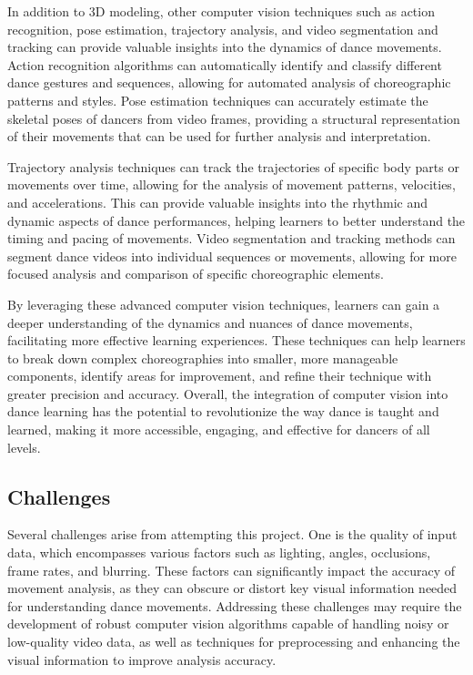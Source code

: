  In addition to 3D modeling, other computer vision techniques such as action recognition, pose 
estimation, trajectory analysis, and video segmentation and tracking can provide valuable insights 
into the dynamics of dance movements. Action recognition algorithms can automatically identify and 
classify different dance gestures and sequences, allowing for automated analysis of choreographic 
patterns and styles. Pose estimation techniques can accurately estimate the skeletal poses of 
dancers from video frames, providing a structural representation of their movements that can be 
used for further analysis and interpretation.

Trajectory analysis techniques can track the trajectories of specific body parts or movements 
over time, allowing for the analysis of movement patterns, velocities, and accelerations. \cite{Alpher02}This 
can provide valuable insights into the rhythmic and dynamic aspects of dance performances, 
helping learners to better understand the timing and pacing of movements. Video segmentation and 
tracking methods can segment dance videos into individual sequences or movements, allowing for more 
focused analysis and comparison of specific choreographic elements.

By leveraging these advanced computer vision techniques, learners can gain a deeper understanding 
of the dynamics and nuances of dance movements, facilitating more effective learning experiences. 
These techniques can help learners to break down complex choreographies into smaller, more 
manageable components, identify areas for improvement, and refine their technique with greater 
precision and accuracy. Overall, the integration of computer vision into dance learning has the 
potential to revolutionize the way dance is taught and learned, making it more accessible, engaging, 
and effective for dancers of all levels.

\subsection{Challenges}
Several challenges arise from attempting this project. One is the quality of input data, which 
encompasses various factors such as lighting, angles, occlusions, frame rates, and blurring. These 
factors can significantly impact the accuracy of movement analysis, as they can obscure or distort 
key visual information needed for understanding dance movements. Addressing these challenges may 
require the development of robust computer vision algorithms capable of handling noisy or low-quality 
video data, as well as techniques for preprocessing and enhancing the visual information to improve 
analysis accuracy.

